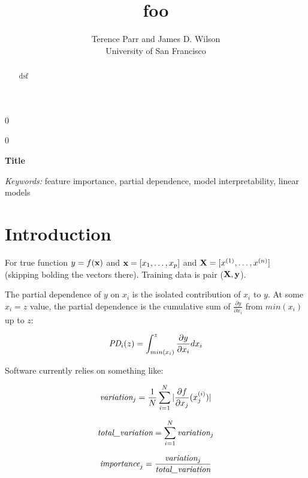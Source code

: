 \documentclass[12pt]{article}
\newcommand{\blind}{0}
\begin{document}
\def\spacingset#1{\renewcommand{\baselinestretch}%
{#1}\small\normalsize} \spacingset{1}



\blind
{
  \title{\bf foo}

  \author{Terence Parr and James D. Wilson\\
      University of San Francisco\\
}
  \maketitle
} \fi

\blind
{
  \bigskip
  \bigskip
  \bigskip
  \begin{center}
    {\LARGE\bf Title}
\end{center}
  \medskip
} \fi

\bigskip
\begin{abstract}
dsf
\end{abstract}

\noindent%
{\it Keywords:} feature importance, partial dependence, model interpretability, linear models


\section{Introduction}
\label{sec:intro}

For true function $y = f(\bf x)$ and ${\bf x} = [x_1, \ldots, x_p]$ and ${\bf X} = [x^{(1)}, \ldots, x^{(n)}]$ (skipping bolding the vectors there).  Training data is pair ($\bf X, y$).

The partial dependence of $y$ on  $x_i$ is the isolated contribution of $x_i$ to $y$. At some $x_i=z$ value, the partial dependence is the cumulative sum of $\frac{\partial y}{\partial x_i}$ from $min(x_i)$ up to $z$:

\[
\text{\it PD}_i(z) = \int_{min(x_i)}^z \frac{\partial y}{\partial x_i} dx_i
\]

Software currently relies on something like:

\[
\text{\it variation}_j = \frac{1}{N} \sum_{i=1}^N |\frac{\partial f}{\partial x_j}(x_j^{(i)})|
\]

\[
\text{\it total\_variation} = \sum_{i=1}^N \text{\it variation}_j
\]

\[
\text{\it importance}_j = \frac{\text{\it variation}_j}{\text{\it total\_variation}}
\]
\end{document}
